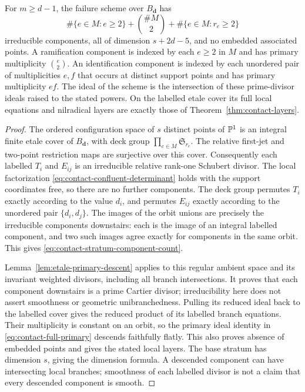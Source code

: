 \begin{corollary}
\label{cor:contact-multiplicity-strata}
For $m\ge d-1$, the failure scheme over $B_{\boldsymbol d}$ has
\begin{equation}\label{eq:contact-stratum-component-count}
 \#\{e\in M:e\ge2\}+\binom{\#M}{2}
                         +\#\{e\in M:r_e\ge2\}
\end{equation}
irreducible components, all of dimension $s+2d-5$, and no embedded
associated points. A ramification component is indexed by each
$e\ge2$ in $M$ and has primary multiplicity $\binom e2$. An
identification component is indexed by each unordered pair of
multiplicities $e,f$ that occurs at distinct support points and has
primary multiplicity $ef$. The ideal of the scheme is the
intersection of these prime-divisor ideals raised to the stated
powers. On the labelled etale cover its full local equations and
nilradical layers are exactly those of
Theorem~\ref{thm:contact-layers}.
\end{corollary}
\begin{proof}
The ordered configuration space of $s$ distinct points of $\mathbb P^1$
is an integral finite etale cover of $B_{\boldsymbol d}$, with
deck group $\prod_{e\in M}\mathfrak S_{r_e}$. The relative
first-jet and two-point restriction maps are surjective over this
cover. Consequently each labelled $T_i$ and $E_{ij}$ is an
irreducible relative rank-one Schubert divisor. The local
factorization \eqref{eq:contact-confluent-determinant} holds with
the support coordinates free, so there are no further components.
The deck group permutes $T_i$ exactly according to the value $d_i$,
and permutes $E_{ij}$ exactly according to the unordered pair
$\{d_i,d_j\}$. The images of the orbit unions are precisely the
irreducible components downstairs: each is the image of an integral
labelled component, and two such images agree exactly for components
in the same orbit. This gives \eqref{eq:contact-stratum-component-count}.

Lemma~\ref{lem:etale-primary-descent} applies to this regular ambient
space and its invariant weighted divisors, including all branch
intersections. It proves that each component downstairs is a prime
Cartier divisor; irreducibility here does not assert smoothness or
geometric unibranchedness. Pulling its reduced ideal back to the labelled cover
gives the reduced product of its labelled branch equations. Their
multiplicity is constant on an orbit, so the primary ideal identity
in \eqref{eq:contact-full-primary} descends faithfully flatly. This
also proves absence of embedded points and gives the stated local
layers. The base stratum has dimension $s$, giving the dimension
formula. A descended component can have intersecting local branches;
smoothness of each labelled divisor is not a claim that every
descended component is smooth.
\end{proof}

